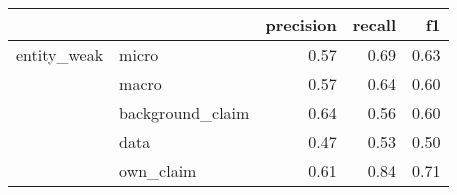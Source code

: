 \begin{tabular}{llrrr}
\toprule
            &           &  precision &  recall &   f1 \\
\midrule
entity\_weak & micro &       0.57 &    0.69 & 0.63 \\
            & macro &       0.57 &    0.64 & 0.60 \\
            & background\_claim &       0.64 &    0.56 & 0.60 \\
            & data &       0.47 &    0.53 & 0.50 \\
            & own\_claim &       0.61 &    0.84 & 0.71 \\
\bottomrule
\end{tabular}
